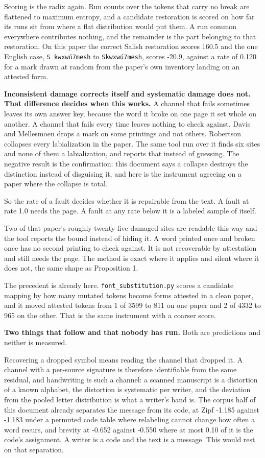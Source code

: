 Scoring is the radix again. Run counts over the tokens that carry no break are flattened to maximum entropy, and a candidate restoration is scored on how far its runs sit from where a flat distribution would put them. A run common everywhere contributes nothing, and the remainder is the part belonging to that restoration. On this paper the correct Salish restoration scores 160.5 and the one English case, \texttt{S kwxwú7mesh} to \texttt{Skwxwú7mesh}, scores -20.9, against a rate of 0.120 for a mark drawn at random from the paper's own inventory landing on an attested form.

\textbf{Inconsistent damage corrects itself and systematic damage does not. That difference decides when this works.} A channel that fails sometimes leaves its own answer key, because the word it broke on one page it set whole on another. A channel that fails every time leaves nothing to check against. Davis and Mellesmoen drops a mark on some printings and not others. Robertson collapses every labialization in the paper. The same tool run over it finds six sites and none of them a labialization, and reports that instead of guessing. The negative result is the confirmation: this document says a collapse destroys the distinction instead of disguising it, and here is the instrument agreeing on a paper where the collapse is total.

So the rate of a fault decides whether it is repairable from the text. A fault at rate 1.0 needs the page. A fault at any rate below it is a labeled sample of itself.

Two of that paper's roughly twenty-five damaged sites are readable this way and the tool reports the bound instead of hiding it. A word printed once and broken once has no second printing to check against. It is not recoverable by attestation and still needs the page. The method is exact where it applies and silent where it does not, the same shape as Proposition 1.

The precedent is already here. \texttt{font\_\allowbreak{}substitution.\allowbreak{}py} scores a candidate mapping by how many mutated tokens become forms attested in a clean paper, and it moved attested tokens from 1 of 3599 to 811 on one paper and 2 of 4332 to 965 on the other. That is the same instrument with a coarser score.

\textbf{Two things that follow and that nobody has run.} Both are predictions and neither is measured.

Recovering a dropped symbol means reading the channel that dropped it. A channel with a per-source signature is therefore identifiable from the same residual, and handwriting is such a channel: a scanned manuscript is a distortion of a known alphabet, the distortion is systematic per writer, and the deviation from the pooled letter distribution is what a writer's hand is. The corpus half of this document already separates the message from its code, at Zipf -1.185 against -1.183 under a permuted code table where relabeling cannot change how often a word recurs, and brevity at -0.652 against -0.550 where at most 0.10 of it is the code's assignment. A writer is a code and the text is a message. This would rest on that separation.


